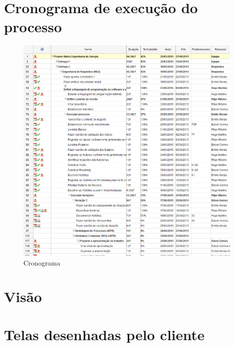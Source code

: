 \begin{apendicesenv}

\partapendices

\chapter{Cronograma de execução do processo}
\label{cronograma}
\begin{figure}[!htb]
\centering
\includegraphics[scale=0.55]{figuras/cronograma_execucao.png}
\caption{Cronograma}
\end{figure}



\chapter{Visão}
  \label{visao}

\chapter{Telas desenhadas pelo cliente} 
\label{telas}


\end{apendicesenv}
